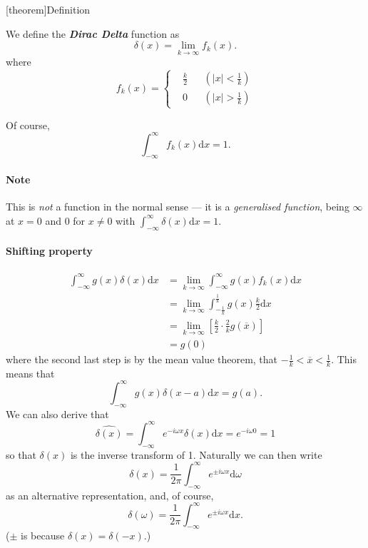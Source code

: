 \documentclass[12pt]{report}
\theoremstyle{definition}
\begin{document}
[theorem]{Definition}
\begin{Dirac Delta Function}
We define the \textbf{\emph{Dirac Delta}} function as\[
    \delta(x) = \lim_{k\rightarrow{}\infty}f_k(x).
\]where\[
    f_k(x) = \left\{\begin{align*}
        & \frac{k}{2} && (|x|<\frac{1}{k}) \\
        & 0 && (|x|>\frac{1}{k})
    \end{align*} 
\]
\end{Dirac Delta Function}

Of course,\[
\int_{-\infty}^{\infty} f_k(x)\mathrm{d}x = 1.
\]

\paragraph{Note}

This is \emph{not} a function in the normal sense ---
it is a \emph{generalised function}, being $\infty$ at $x=0$ and 0 for $x\neq 0$
with $\int_{-\infty}^{\infty} \delta(x)\mathrm{d}x=1$.

\paragraph{Shifting property}
\begin{align*}
    \int_{-\infty}^{\infty} g(x)\delta(x)\mathrm{d}x
    & = \lim_{k\rightarrow{}\infty}\int_{-\infty}^{\infty} g(x)f_k(x)\mathrm{d}x \\
    & = \lim_{k\rightarrow{}\infty}\int_{-\frac{1}{k}}^{\frac{1}{k}} g(x)\frac{k}{2}\mathrm{d}x \\
    & = \lim_{k\rightarrow{}\infty}\left[\frac{k}{2}\cdot \frac{2}{k}g(\overline{x})\right] \\
    & = g(0)
\end{align*} 
where the second last step is by the mean value theorem, that $-\frac{1}{k}<\overline{x}<\frac{1}{k}$.
This means that\[
    \int_{-\infty}^{\infty} g(x)\delta(x-a)\mathrm{d}x = g(a).
\]We can also derive that\[
\widehat{\delta(x)} = \int_{-\infty}^{\infty} e^{-i\omega x}\delta(x)\mathrm{d}x = e^{-i\omega 0}= 1
\]
so that $\delta(x)$ is the inverse transform of 1. Naturally we can then write\[
    \delta(x) = \frac{1}{2\pi}\int_{-\infty}^{\infty} e^{\pm i\omega x}\mathrm{d}\omega
\]as an alternative representation, and, of course,\[
    \delta(\omega) = \frac{1}{2\pi}\int_{-\infty}^{\infty} e^{\pm i\omega x}\mathrm{d}x.
\]
($\pm$ is because $\delta(x) = \delta(-x)$.)
\end{document}
